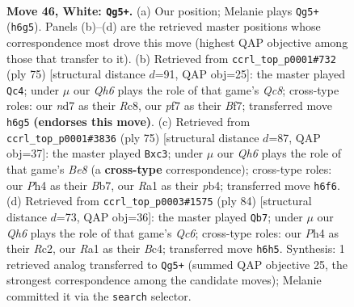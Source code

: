 \documentclass[11pt]{article}
\begin{document}
\clearpage

\begin{figure}[p]\centering
\begin{subfigure}{0.46\textwidth}\centering
\resizebox{\linewidth}{!}{%
\newchessgame
\chessboard[
  setfen={3q2k1/1b1n1p2/3P1n1Q/2p5/p6P/5pP1/PB6/R5K1 w - - 5 46},
  showmover=false,
  pgfstyle=straightmove, color=movearrow, markmove={h6-g5}
]}
\caption{}
\end{subfigure}\hfill
\begin{subfigure}{0.46\textwidth}\centering
\resizebox{\linewidth}{!}{%
\newchessgame
\chessboard[
  setfen={2r3k1/5b2/p2p1p1p/Pp5P/3QN3/6N1/1P4PK/2q5 b - - 11 38},
  showmover=false,
  pgfstyle=straightmove, color=movearrow, markmove={c1-c4}
]}
\caption{}
\end{subfigure}
\\[4pt]
\begin{subfigure}{0.46\textwidth}\centering
\resizebox{\linewidth}{!}{%
\newchessgame
\chessboard[
  setfen={8/kb5p/1p4p1/4q3/1PQ1p3/P1N5/2P1N1PP/4b2K b - - 11 38},
  showmover=false,
  pgfstyle=straightmove, color=movearrow, markmove={e1-c3}
]}
\caption{}
\end{subfigure}\hfill
\begin{subfigure}{0.46\textwidth}\centering
\resizebox{\linewidth}{!}{%
\newchessgame
\chessboard[
  setfen={8/q3bpk1/P1Q2np1/4p3/1PB1n2p/8/2R3PP/1K6 w - - 0 43},
  showmover=false,
  pgfstyle=straightmove, color=movearrow, markmove={c6-b7}
]}
\caption{}
\end{subfigure}
\caption{\textbf{Move 46, White: \texttt{Qg5+}.} (a) Our position; Melanie plays \texttt{Qg5+} (\texttt{h6g5}). Panels (b)--(d) are the retrieved master positions whose correspondence most drove this move (highest QAP objective among those that transfer to it). (b) Retrieved from \texttt{ccrl\_top\_p0001\#732} (ply 75) [structural distance $d$=91, QAP obj=25]: the master played \texttt{Qc4}; under $\mu$ our \emph{Qh6} plays the role of that game's \emph{Qc8}; cross-type roles: our \emph{n}d7 as their \emph{R}c8, our \emph{p}f7 as their \emph{B}f7; transferred move \texttt{h6g5} \textbf{(endorses this move)}. (c) Retrieved from \texttt{ccrl\_top\_p0001\#3836} (ply 75) [structural distance $d$=87, QAP obj=37]: the master played \texttt{Bxc3}; under $\mu$ our \emph{Qh6} plays the role of that game's \emph{Be8} (a \textbf{cross-type} correspondence); cross-type roles: our \emph{P}h4 as their \emph{B}b7, our \emph{R}a1 as their \emph{p}b4; transferred move \texttt{h6f6}. (d) Retrieved from \texttt{ccrl\_top\_p0003\#1575} (ply 84) [structural distance $d$=73, QAP obj=36]: the master played \texttt{Qb7}; under $\mu$ our \emph{Qh6} plays the role of that game's \emph{Qc6}; cross-type roles: our \emph{P}h4 as their \emph{R}c2, our \emph{R}a1 as their \emph{B}c4; transferred move \texttt{h6h5}. Synthesis: 1 retrieved analog transferred to \texttt{Qg5+} (summed QAP objective 25, the strongest correspondence among the candidate moves); Melanie committed it via the \texttt{search} selector.}
\label{fig:thought-m90}
\end{figure}
\end{document}
